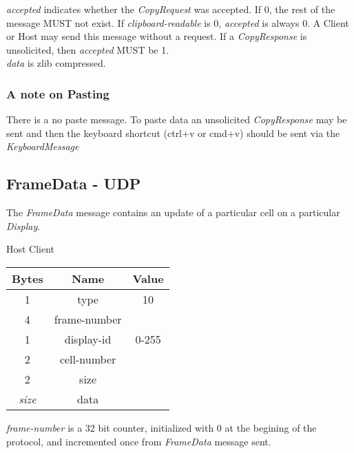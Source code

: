 \documentclass{article}
\begin{document}
    \emph{accepted} indicates whether the \emph{CopyRequest} was accepted. If 0, the rest of the message MUST not exist.
    If \emph{clipboard-readable} is 0, \emph{accepted} is always 0. A Client or Host may send this message without a
    request.
    If a \emph{CopyResponse} is unsolicited, then \emph{accepted} MUST be 1.\\

    \emph{data} is zlib compressed.

    \subsubsection{A note on Pasting}

    There is a no paste message. To paste data an unsolicited \emph{CopyResponse} may be sent and then the keyboard
    shortcut (ctrl+v or cmd+v) should be sent via the \emph{KeyboardMessage}

    \subsection{FrameData - UDP}
    The \emph{FrameData} message contains an update of a particular cell on a particular \emph{Display}.

    \begin{center}
        Host \textrightarrow Client\\
        \begin{tabular}{|c|c|c|}
            \hline
            \textbf{Bytes} & \textbf{Name} & \textbf{Value} \\
            \hline
            1              & type          & 10             \\
            \hline
            4              & frame-number  &                \\
            \hline
            1              & display-id    & 0-255          \\
            \hline
            2              & cell-number   &                \\
            \hline
            2              & size          &                \\
            \hline
            \emph{size}    & data          &                \\
            \hline
        \end{tabular}
    \end{center}

    \emph{frame-number} is a 32 bit counter, initialized with 0 at the begining of the protocol, and incremented once
    from \emph{FrameData} message sent.
\end{document}
